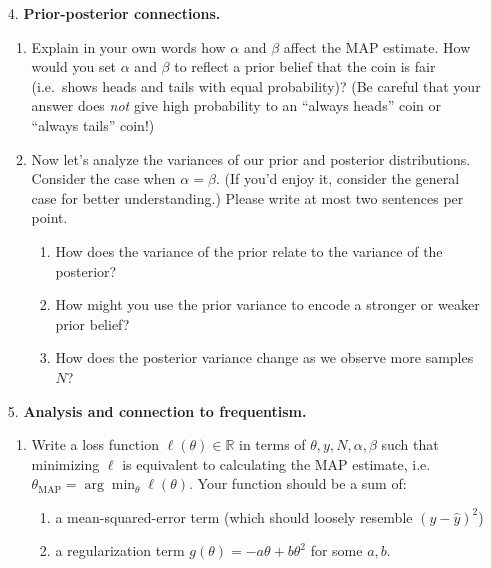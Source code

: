\documentclass[submit]{../harvardml}
\begin{document}
\begin{framed}
\begin{enumerate}
    \item[4.]
      \textbf{Prior-posterior connections.}

      \begin{enumerate}
        \item
              Explain in your own words how \(\alpha\) and \(\beta\) affect the
              MAP estimate. How would you set \(\alpha\) and \(\beta\) to reflect
              a prior belief that the coin is fair (i.e.~shows heads and tails
              with equal probability)? (Be careful that your answer does \emph{not} give high probability to an ``always heads'' coin or ``always tails'' coin!)

        \item Now let's analyze the variances of our prior and posterior distributions. Consider the case when $\alpha = \beta$. (If you'd enjoy it, consider the general case for better understanding.) Please write at most two sentences per point.
              \begin{enumerate}
                \item How does the variance of the prior relate to the variance of the posterior?
                \item How might you use the prior variance to encode a stronger or weaker prior belief?
                \item How does the posterior variance change as we observe more samples $N$?
              \end{enumerate}
      \end{enumerate}

    \item[5.]
      \textbf{Analysis and connection to frequentism.}

      \begin{enumerate}
        \item
              Write a loss function \(\ell(\theta) \in \mathbb{R}\) in terms of
              \(\theta, y, N, \alpha, \beta\) such that minimizing \(\ell\) is
              equivalent to calculating the MAP estimate,
              i.e.~\(\theta_{\text{MAP}} = \arg \min_{\theta} \ell(\theta)\). Your
              function should be a sum of:
              \begin{enumerate}
                \item a mean-squared-error term (which should loosely resemble $(y - \hat y)^2$)
                \item a
                      regularization term \(g(\theta) = - a \theta + b \theta^{2}\) for some $a, b$.
              \end{enumerate}


\end{enumerate}
\end{enumerate}
\end{framed}
\end{document}
